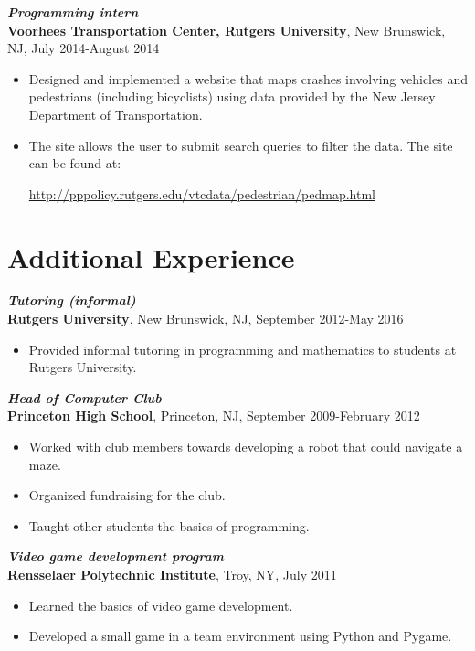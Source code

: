 \documentclass[12pt]{article}
\begin{document}
\textit{\textbf{Programming intern}} \\
\textbf{Voorhees Transportation Center, Rutgers University}, New Brunswick, NJ, July 2014-August 2014
\begin{itemize}
\item
Designed and implemented a website that maps crashes involving vehicles and pedestrians (including bicyclists) using data provided by the New Jersey Department of Transportation.
\item
The site allows the user to submit search queries to filter the data. The site can be found at:
\begin{center}
\url{http://pppolicy.rutgers.edu/vtcdata/pedestrian/pedmap.html}
\end{center}
\end{itemize}

\iffalse

\section*{Additional Experience}

\textit{\textbf{Tutoring (informal)}} \\
\textbf{Rutgers University}, New Brunswick, NJ, September 2012-May 2016
\begin{itemize}
\item
Provided informal tutoring in programming and mathematics to students at Rutgers University.
\end{itemize}

\textit{\textbf{Head of Computer Club}} \\
\textbf{Princeton High School}, Princeton, NJ, September 2009-February 2012
\begin{itemize}
\item
Worked with club members towards developing a robot that could navigate a maze.
\item
Organized fundraising for the club.
\item
Taught other students the basics of programming.
\end{itemize}

\textit{\textbf{Video game development program}} \\
\textbf{Rensselaer Polytechnic Institute}, Troy, NY, July 2011
\begin{itemize}
\item
Learned the basics of video game development.
\item
Developed a small game in a team environment using Python and Pygame.
\end{itemize}
\end{document}

